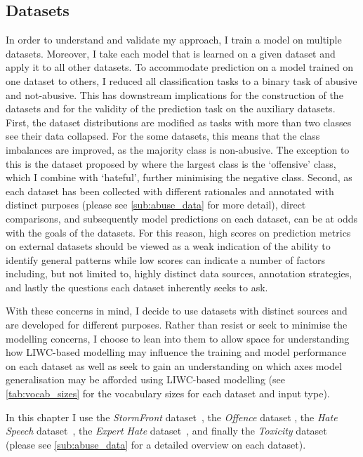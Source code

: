 \subsection{Datasets}\label{sub:liwc_datasets}
In order to understand and validate my approach, I train a model on multiple datasets. Moreover, I take each model that is learned on a given dataset and apply it to all other datasets. To accommodate prediction on a model trained on one dataset to others, I reduced all classification tasks to a binary task of abusive and not-abusive. This has downstream implications for the construction of the datasets and for the validity of the prediction task on the auxiliary datasets.
First, the dataset distributions are modified as tasks with more than two classes see their data collapsed. For the some datasets, this means that the class imbalances are improved, as the majority class is non-abusive. The exception to this is the dataset proposed by \citet{Davidson:2017} where the largest class is the `offensive' class, which I combine with `hateful', further minimising the negative class.
Second, as each dataset has been collected with different rationales and annotated with distinct purposes (please see \cref{sub:abuse_data} for more detail), direct comparisons, and subsequently model predictions on each dataset, can be at odds with the goals of the datasets. For this reason, high scores on prediction metrics on external datasets should be viewed as a weak indication of the ability to identify general patterns while low scores can indicate a number of factors including, but not limited to, highly distinct data sources, annotation strategies, and lastly the questions each dataset inherently seeks to ask.

With these concerns in mind, I decide to use datasets with distinct sources and are developed for different purposes. Rather than resist or seek to minimise the modelling concerns, I choose to lean into them to allow space for understanding how LIWC-based modelling may influence the training and model performance on each dataset as well as seek to gain an understanding on which axes model generalisation may be afforded using LIWC-based modelling (see \cref{tab:vocab_sizes} for the vocabulary sizes for each dataset and input type).

In this chapter I use the \textit{StormFront} dataset~\citep{Garcia:2019}, the \textit{Offence} dataset \citep{Davidson:2017}, the \textit{Hate Speech} dataset~\citep{Waseem-Hovy:2016}, the \textit{Expert Hate} dataset~\citep{Waseem:2016}, and finally the \textit{Toxicity} dataset~\citep{Wulczyn:2017} (please see \cref{sub:abuse_data} for a detailed overview on each dataset).

